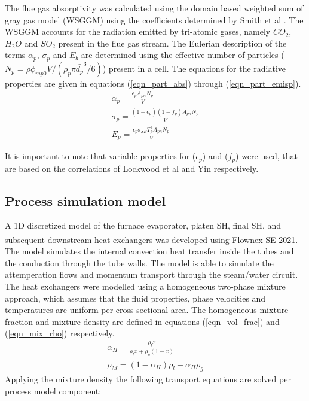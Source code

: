 \documentclass[review]{elsarticle}
\begin{document}
The flue gas absorptivity was calculated using the domain based weighted sum of gray gas model (WSGGM) using the coefficients determined by Smith et al \cite{Smith1982}. The WSGGM accounts for the radiation emitted by tri-atomic gases, namely $CO_2$, $H_2O$ and $SO_2$ present in the flue gas stream. The Eulerian description of the terms $\alpha_p$, $\sigma_p$ and $E_b$ are determined using the effective number of particles ($N_p = \rho \phi_{mp0} V / \left( \rho_p \pi \bar{d_p}^3 /6 \right)$) present in a cell. The equations for the radiative properties are given in equations (\ref{eqn_part_abs}) through (\ref{eqn_part_emisp}).
\begin{gather}
\alpha_p = \frac{\epsilon_p A_{pn}N_p}{V} \label{eqn_part_abs}\\
\sigma_p = \frac{(1-\epsilon_p)(1-f_p) A_{pn}N_p}{V} \label{eqn_part_scat} \\
E_p = \frac{\epsilon_p \sigma_{SB} T_p^4 A_{pn}N_p}{V}\label{eqn_part_emisp}
\end{gather}

It is important to note that variable properties for ($\epsilon_p$) and ($f_p$) were used, that are based on the correlations of Lockwood et al \cite{Lockwood1986} and Yin \citep{Yin2015} respectively.

\subsection{Process simulation model}
A 1D discretized model of the furnace evaporator, platen SH, final SH, and subsequent downstream heat exchangers was developed using Flownex SE\textsuperscript{\textregistered} 2021. The model simulates the internal convection heat transfer inside the tubes and the conduction through the tube walls. The model is able to simulate the attemperation flows and momentum transport through the steam/water circuit. The heat exchangers were modelled using a homogeneous two-phase mixture approach, which assumes that the fluid properties, phase velocities and temperatures are uniform per cross-sectional area. The homogeneous mixture fraction and mixture density are defined in equations (\ref{eqn_vol_frac}) and (\ref{eqn_mix_rho}) respectively.
\begin{gather}
\alpha_H = \frac{\rho_l x}{\rho_lx + \rho_g(1-x)} \label{eqn_vol_frac}\\  
\rho_M = (1-\alpha_H)\rho_l + \alpha_H\rho_g \label{eqn_mix_rho}
\end{gather}
Applying the mixture density the following transport equations are solved per process model component;
\end{document}
